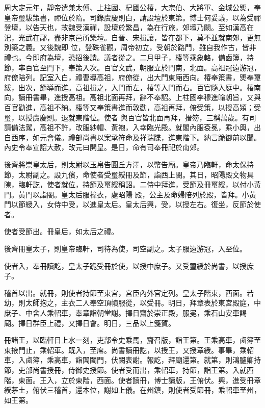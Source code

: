 
\begin{pinyinscope}

 周大定元年，靜帝遣兼太傅、上柱國、杞國公椿，大宗伯、大將軍、金城公煚，奉皇帝璽紱策書，禪位於隋。司錄虞慶則白，請設壇於東第。博士何妥議，以為受禪登壇，以告天也，故魏受漢禪，設壇於繁昌，為在行旅，郊壇乃闕。至如漢高在汜，光武在鄗，盡非京邑所築壇。自晉、宋揖讓，皆在都下，莫不並就南郊，更無別築之義。又後魏即
 位，登硃雀觀，周帝初立，受朝於路門，雖自我作古，皆非禮也。今即府為壇，恐招後誚。議者從之。二月甲子，椿等乘象輅，備鹵簿，持節，率百官至門下，奉策入次。百官文武，朝服立於門南，北面。高祖冠遠游冠，府僚陪列。記室入白，禮曹導高祖，府僚從，出大門東廂西向。椿奉策書，煚奉璽紱，出次，節導而進。高祖揖之，入門而左，椿等入門而右。百官隨入庭中。椿南向，讀冊書畢，進授高祖。高祖北面再拜，辭不奉詔。上柱國李穆進喻朝旨，又與百官勸進，高祖不納。椿等又奉策書進而敦勸，高祖再拜，俯受策，以授高熲；受璽，以授虞慶則。退就東階位。使者
 與百官皆北面再拜，搢笏，三稱萬歲。有司請備法駕，高祖不許，改服紗帽、黃袍，入幸臨光殿。就閣內服袞冕，乘小輿，出自西序，如元會儀。禮部尚書以案承符命及祥瑞牒，進東階下。納言跪御前以聞。內史令奉宣詔大赦，改元曰開皇。是日，命有司奉冊祀於南郊。



 後齊將崇皇太后，則太尉以玉帛告圓丘方澤，以幣告廟。皇帝乃臨軒，命太保持節，太尉副之。設九儐，命使者受璽綬冊及節，詣西上閤。其日，昭陽殿文物具陳，臨軒訖，使者就位，持節及璽綬稱詔。二侍中拜進，受節及冊璽綬，以付小黃門。黃門以詣閤。皇太后服褘衣，處昭陽
 殿，公主及命婦陪列於殿，皆拜。小黃門以節綬入，女侍中受，以進皇太后。皇太后興，受，以授左右。復坐，反節於使者。



 使者受節出。冊皇后，如太后之禮。



 後齊冊皇太子，則皇帝臨軒，司待為使，司空副之。太子服遠游冠，入至位。



 使者入，奉冊讀訖，皇太子跪受冊於使，以授中庶子。又受璽綬於尚書，以授庶子。



 稽首以出。就冊，則使者持節至東宮，宮臣內外官定列。皇太子階東，西面。若幼，則太師抱之，主衣二人奉空頂幘服從，以受冊。明日，拜章表於東宮殿庭，中庶子、中舍人乘軺車，奉章詣朝堂謝。擇日齋於崇正殿，服冕，乘石山安車謁
 廟。擇日群臣上禮，又擇日會。明日，三品以上箋賀。



 冊諸王，以臨軒日上水一刻，吏部令史乘馬，齎召版，詣王第。王乘高車，鹵簿至東掖門止，乘軺車。既入，至席。尚書讀冊訖，以授王，又授章綬。事畢，乘軺車，入鹵簿，乘高車，詣閶闔門，伏闕表謝。報訖，拜廟還第。就第，則鴻臚卿持節，吏部尚書授冊，侍御史授節。使者受而出，乘軺車，持節，詣王第。入就西階，東面。王入，立於東階，西面。使者讀冊，博士讀版，王俯伏。興，進受冊章綬茅土，俯伏三稽首，還本位，謝如上儀。在州鎮，則使者受節冊，乘軺車至州，如王第。




\end{pinyinscope}
